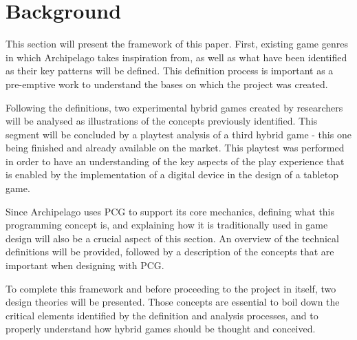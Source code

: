 \section{Background}
This section will present the framework of this paper. First, existing game genres in which Archipelago takes inspiration from, as well as what have been identified as their key patterns will be defined. This definition process is important as a pre-emptive work to understand the bases on which the project was created. 

Following the definitions, two experimental hybrid games created by researchers will be analysed as illustrations of the concepts previously identified. This segment will be concluded by a playtest analysis of a third hybrid game - this one being finished and already available on the market. This playtest was performed in order to have an understanding of the key aspects of the play experience that is enabled by the implementation of a digital device in the design of a tabletop game.

Since Archipelago uses PCG to support its core mechanics, defining what this programming concept is, and explaining how it is traditionally used in game design will also be a crucial aspect of this section. An overview of the technical definitions will be provided, followed by a description of the concepts that are important when designing with PCG. 

To complete this framework and before proceeding to the project in itself, two design theories will be presented. Those concepts are essential to boil down the critical elements identified by the definition and analysis processes, and to properly understand how hybrid games should be thought and conceived.


